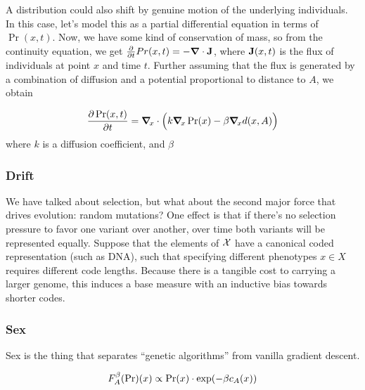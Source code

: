 \documentclass{article}
\begin{document}
A distribution could also shift by genuine motion of the underlying individuals.
In this case, let's model this as a partial differential equation in terms of $\Pr(x,t)$.
Now, we have some kind of conservation of mass, so from the continuity equation, we get
$\frac{\partial }{\partial t}Pr(x,t) = - \vgrad \cdot \mat J$,
where $\mat J(x,t)$ is the flux of individuals at point $x$ and time $t$.
Further assuming that the flux is generated by a combination of diffusion and a potential proportional to distance to $A$, we obtain

\[
    \frac{\partial \Pr(x, t)}{\partial t} = \vgrad_{\!x} \cdot \Big( k \vgrad_{\!x} \Pr (x) - \beta \vgrad_{\!x} d(x, A) \Big)
\]
where $k$ is a diffusion coefficient, and $\beta$



\subsubsection{Drift}
We have talked about selection, but what about the second major force that drives evolution: random mutations? 
One effect is that if there's no selection pressure to favor one variant over another, over time both variants will be represented equally.
Suppose that the elements of $\X$ have a canonical coded representation (such as DNA), such that specifying different phenotypes $x \in X$ requires different code lengths.
Because there is a tangible cost to carrying a larger genome, this induces a base measure with an inductive bias towards shorter codes.  

\subsubsection{Sex}
Sex is the thing that separates ``genetic algorithms'' from vanilla gradient descent. 

\begin{align*}
    F^\beta_A(\Pr)(x) &\propto \Pr(x) \cdot \exp(-\beta \cost xA) \\
\end{align*}



\newpage%
\end{document}
